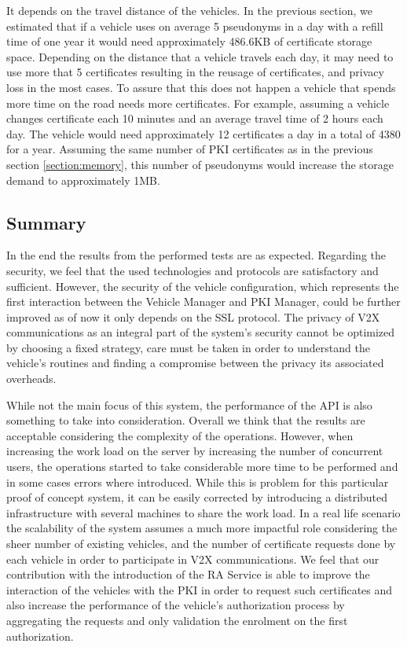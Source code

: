 It depends on the travel distance of the vehicles. In the previous section, we estimated that if a vehicle uses on average 5 pseudonyms in a day with a refill time of one year it would need approximately 486.6KB of certificate storage space. Depending on the distance that a vehicle travels each day, it may need to use more that 5 certificates resulting in the reusage of certificates, and privacy loss in the most cases. To assure that this does not happen a vehicle that spends more time on the road needs more certificates. For example, assuming a vehicle changes certificate each 10 minutes and an average travel time of 2 hours each day. The vehicle would need approximately 12 certificates a day in a total of 4380 for a year. Assuming the same number of PKI certificates as in the previous section \ref{section:memory}, this number of pseudonyms would increase the storage demand to approximately 1MB.

    
\subsection{Summary}
In the end the results from the performed tests are as expected. Regarding the security, we feel that the used technologies and protocols are satisfactory and sufficient. However, the security of the vehicle configuration, which represents the first interaction between the Vehicle Manager and PKI Manager, could be further improved as of now it only depends on the SSL protocol. The privacy of V2X communications as an integral part of the system's security cannot be optimized by choosing a fixed strategy, care must be taken in order to understand the vehicle's routines and finding a compromise between the privacy its associated overheads.

While not the main focus of this system, the performance of the API is also something to take into consideration. Overall we think that the results are acceptable considering the complexity of the operations. However, when increasing the work load on the server by increasing the number of concurrent users, the operations started to take considerable more time to be performed and in some cases errors where introduced. While this is problem for this particular proof of concept system, it can be easily corrected by introducing a distributed infrastructure with several machines to share the work load. In a real life scenario the scalability of the system assumes a much more impactful role considering the sheer number of existing vehicles, and the number of certificate requests done by each vehicle in order to participate in V2X communications. We feel that our contribution with the introduction of the RA Service is able to improve the interaction of the vehicles with the PKI in order to request such certificates and also increase the performance of the vehicle's authorization process by aggregating the requests and only validation the enrolment on the first authorization.





